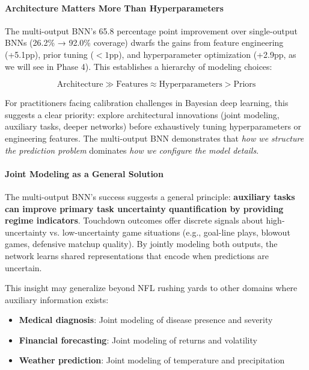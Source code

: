 \paragraph{Architecture Matters More Than Hyperparameters}

The multi-output BNN's 65.8 percentage point improvement over single-output BNNs (26.2\% → 92.0\% coverage) dwarfs the gains from feature engineering (+5.1pp), prior tuning ($<1$pp), and hyperparameter optimization (+2.9pp, as we will see in Phase 4). This establishes a hierarchy of modeling choices:

\begin{equation}
    \text{Architecture} \gg \text{Features} \approx \text{Hyperparameters} > \text{Priors}
\end{equation}

For practitioners facing calibration challenges in Bayesian deep learning, this suggests a clear priority: explore architectural innovations (joint modeling, auxiliary tasks, deeper networks) before exhaustively tuning hyperparameters or engineering features. The multi-output BNN demonstrates that \textit{how we structure the prediction problem} dominates \textit{how we configure the model details}.

\paragraph{Joint Modeling as a General Solution}

The multi-output BNN's success suggests a general principle: \textbf{auxiliary tasks can improve primary task uncertainty quantification by providing regime indicators}. Touchdown outcomes offer discrete signals about high-uncertainty vs. low-uncertainty game situations (e.g., goal-line plays, blowout games, defensive matchup quality). By jointly modeling both outputs, the network learns shared representations that encode when predictions are uncertain.

This insight may generalize beyond NFL rushing yards to other domains where auxiliary information exists:

\begin{itemize}
    \item \textbf{Medical diagnosis}: Joint modeling of disease presence and severity
    \item \textbf{Financial forecasting}: Joint modeling of returns and volatility
    \item \textbf{Weather prediction}: Joint modeling of temperature and precipitation
\end{itemize}

